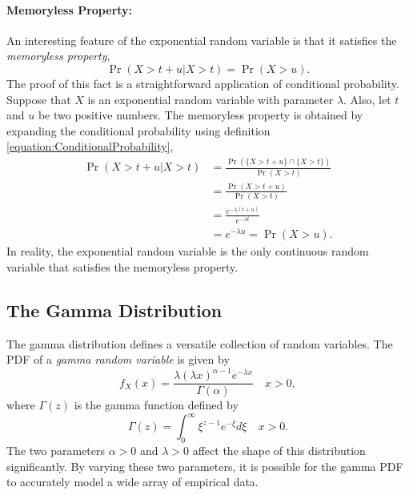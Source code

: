 \paragraph{Memoryless Property:}
An interesting feature of the exponential random variable is that it satisfies the \emph{memoryless property},
\begin{equation*}
\Pr (X > t + u | X > t) = \Pr (X > u).
\end{equation*}
The proof of this fact is a straightforward application of conditional probability.
Suppose that $X$ is an exponential random variable with parameter $\lambda$.
Also, let $t$ and $u$ be two positive numbers.
The memoryless property is obtained by expanding the conditional probability using definition \eqref{equation:ConditionalProbability},
\begin{equation*}
\begin{split}
\Pr (X > t + u | X > t)
&= \frac{\Pr( \{ X > t + u \} \cap \{ X > t \} ) }{ \Pr ( X > t ) } \\
&= \frac{\Pr( X > t + u ) }{ \Pr ( X > t ) } \\
&= \frac{e^{- \lambda (t + u)} }{ e^{- \lambda t } } \\
&= e^{- \lambda u } = \Pr (X > u).
\end{split}
\end{equation*}
In reality, the exponential random variable is the only continuous random variable that satisfies the memoryless property.

\begin{example}
\end{example}


\subsection{The Gamma Distribution}

The gamma distribution defines a versatile collection of random variables.
The PDF of a \emph{gamma random variable} is given by
\begin{equation*}
f_X (x) = \frac{\lambda (\lambda x)^{\alpha - 1} e^{-\lambda x}}{\Gamma (\alpha)} \quad  x > 0,
\end{equation*}
where $\Gamma(z)$ is the gamma function defined by
\begin{equation*}
\Gamma (z) = \int_0^{\infty} \xi^{z-1} e^{-\xi} d\xi \quad x > 0 .
\end{equation*}
The two parameters $\alpha > 0$ and $\lambda > 0$ affect the shape of this distribution significantly.
By varying these two parameters, it is possible for the gamma PDF to accurately model a wide array of empirical data.

